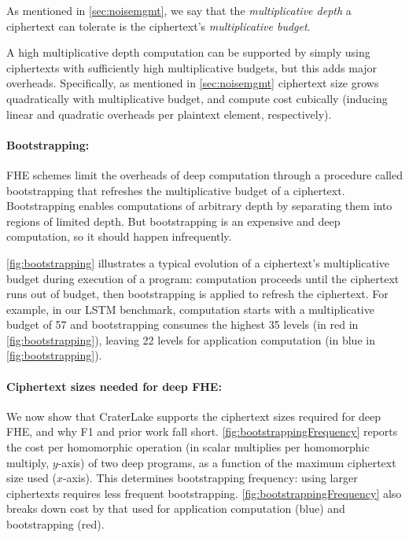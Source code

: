 As mentioned in \autoref{sec:noisemgmt}, we say that the \emph{multiplicative
depth} a ciphertext can tolerate is the ciphertext's \emph{multiplicative
budget}.

A high multiplicative depth computation can be supported by simply using
ciphertexts with sufficiently high multiplicative budgets, but this adds major
overheads. Specifically, as mentioned in \autoref{sec:noisemgmt} ciphertext
size grows quadratically with multiplicative budget, and compute cost cubically
(inducing linear and quadratic overheads per plaintext element, respectively).


\paragraph{Bootstrapping:} FHE schemes limit the overheads of deep computation
through a procedure called bootstrapping that refreshes the multiplicative
budget of a ciphertext. Bootstrapping enables computations of arbitrary depth
by separating them into regions of limited depth. But
bootstrapping is an expensive and deep computation, so it should happen
infrequently.

\figBootstrapping

\autoref{fig:bootstrapping} illustrates a typical evolution of a ciphertext's
multiplicative budget during execution of a program: computation proceeds until
the ciphertext runs out of budget, then bootstrapping is applied to refresh the
ciphertext. For example, in our LSTM benchmark, computation starts with a
multiplicative budget of 57 and bootstrapping consumes the highest 35 levels
(in red in \autoref{fig:bootstrapping}), leaving 22 levels for application
computation (in blue in \autoref{fig:bootstrapping}).

\paragraph{Ciphertext sizes needed for deep FHE:}
We now show that CraterLake supports the ciphertext sizes required for deep FHE, and
why F1 and prior work fall short. \autoref{fig:bootstrappingFrequency} reports the
cost per homomorphic operation (in scalar multiplies per homomorphic multiply,
$y$-axis) of two deep programs, as a function of the maximum ciphertext size
used ($x$-axis). This determines bootstrapping frequency: using larger
ciphertexts requires less frequent bootstrapping.
\autoref{fig:bootstrappingFrequency} also breaks down cost by that used for
application computation (blue) and bootstrapping (red).

